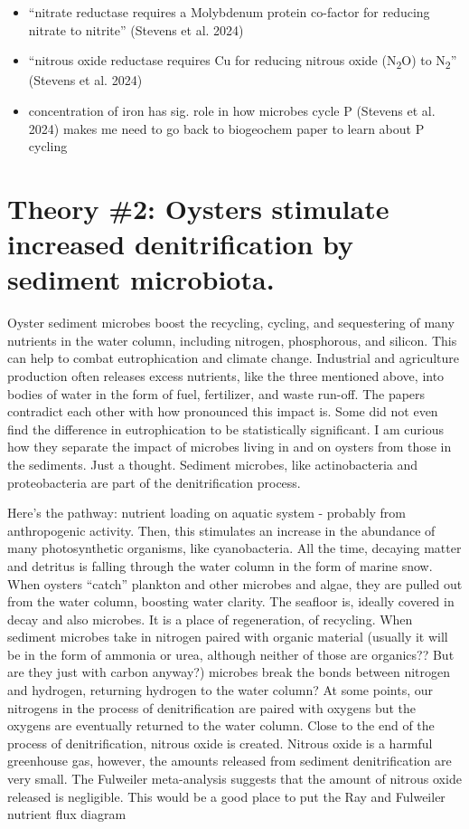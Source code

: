 \documentclass[
  11pt,
]{article}
\begin{document}
\begin{itemize}
\item
  ``nitrate reductase requires a Molybdenum protein co-factor for
  reducing nitrate to nitrite'' (Stevens et al. 2024)
\item
  ``nitrous oxide reductase requires Cu for reducing nitrous oxide
  (N\textsubscript{2}O) to N\textsubscript{2}'' (Stevens et al. 2024)
\item
  concentration of iron has sig. role in how microbes cycle P (Stevens
  et al. 2024) makes me need to go back to biogeochem paper to learn
  about P cycling
\end{itemize}

\section{Theory \#2: Oysters stimulate increased denitrification by
sediment
microbiota.}\label{theory-2-oysters-stimulate-increased-denitrification-by-sediment-microbiota.}

Oyster sediment microbes boost the recycling, cycling, and sequestering
of many nutrients in the water column, including nitrogen, phosphorous,
and silicon. This can help to combat eutrophication and climate change.
Industrial and agriculture production often releases excess nutrients,
like the three mentioned above, into bodies of water in the form of
fuel, fertilizer, and waste run-off. The papers contradict each other
with how pronounced this impact is. Some did not even find the
difference in eutrophication to be statistically significant. I am
curious how they separate the impact of microbes living in and on
oysters from those in the sediments. Just a thought. Sediment microbes,
like actinobacteria and proteobacteria are part of the denitrification
process.

Here's the pathway: nutrient loading on aquatic system - probably from
anthropogenic activity. Then, this stimulates an increase in the
abundance of many photosynthetic organisms, like cyanobacteria. All the
time, decaying matter and detritus is falling through the water column
in the form of marine snow. When oysters ``catch'' plankton and other
microbes and algae, they are pulled out from the water column, boosting
water clarity. The seafloor is, ideally covered in decay and also
microbes. It is a place of regeneration, of recycling. When sediment
microbes take in nitrogen paired with organic material (usually it will
be in the form of ammonia or urea, although neither of those are
organics?? But are they just with carbon anyway?) microbes break the
bonds between nitrogen and hydrogen, returning hydrogen to the water
column? At some points, our nitrogens in the process of denitrification
are paired with oxygens but the oxygens are eventually returned to the
water column. Close to the end of the process of denitrification,
nitrous oxide is created. Nitrous oxide is a harmful greenhouse gas,
however, the amounts released from sediment denitrification are very
small. The Fulweiler meta-analysis suggests that the amount of nitrous
oxide released is negligible. This would be a good place to put the Ray
and Fulweiler nutrient flux diagram
\end{document}

